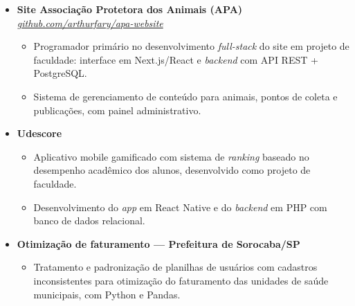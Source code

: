 \documentclass{resume}
\begin{document}
{\begin{itemize}
        \item\textbf{Site Associação Protetora dos Animais (APA)}
        \textit{\newline\href{https://github.com/arthurfary/apa-website}{github.com/arthurfary/apa-website}}
        \begin{itemize}
            \item Programador primário no desenvolvimento \textit{full-stack} do site em projeto de faculdade: interface em Next.js/React e \textit{backend} com API REST + PostgreSQL.
            \item Sistema de gerenciamento de conteúdo para animais, pontos de coleta e publicações, com painel administrativo.
        \end{itemize}

        \item\textbf{Udescore}
        \begin{itemize}
            \item Aplicativo mobile gamificado com sistema de \textit{ranking} baseado no desempenho acadêmico dos alunos, desenvolvido como projeto de faculdade.
            \item Desenvolvimento do \textit{app} em React Native e do \textit{backend} em PHP com banco de dados relacional.
        \end{itemize}

        \item\textbf{Otimização de faturamento — Prefeitura de Sorocaba/SP}
        \begin{itemize}
            \item Tratamento e padronização de planilhas de usuários com cadastros inconsistentes para otimização do faturamento das unidades de saúde municipais, com Python e Pandas.
        \end{itemize}
    \end{itemize}
}
\end{document}
